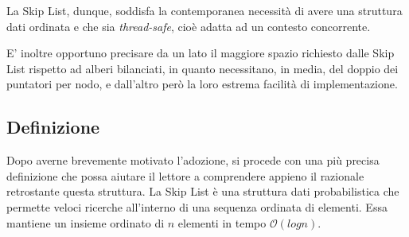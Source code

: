 	La Skip List, dunque, soddisfa la contemporanea necessità di avere una struttura dati ordinata e che sia \textit{thread-safe}, cioè adatta ad un contesto concorrente.
	
	E' inoltre opportuno precisare da un lato il maggiore spazio richiesto dalle Skip List rispetto ad alberi bilanciati, in quanto necessitano, in media, del doppio dei puntatori per nodo, e dall'altro però la loro estrema facilità di implementazione.
	
	\subsection{Definizione}\label{terminologia}
	
%		

	Dopo averne brevemente motivato l'adozione, si procede con una più precisa definizione che possa aiutare il lettore a comprendere appieno il razionale retrostante questa struttura. 
	La Skip List è una struttura dati probabilistica che permette veloci ricerche all'interno di una sequenza ordinata di elementi. Essa mantiene un insieme ordinato di $ n $ elementi in tempo $\mathcal{O}(log{}n)$.
	
